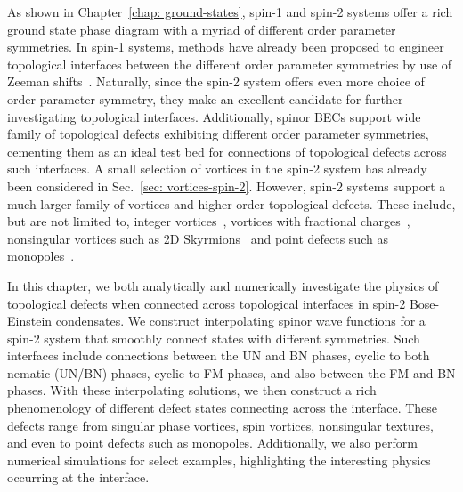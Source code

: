 As shown in Chapter~\ref{chap: ground-states}, spin-1 and spin-2 systems offer a
rich ground state phase diagram with a myriad of different order parameter
symmetries.
In spin-1 systems, methods have already been proposed to engineer topological
interfaces between the different order parameter symmetries by use of Zeeman
shifts~\cite{Borgh2012, Borgh2013, Borgh2014}.
Naturally, since the spin-2 system offers even more choice of order parameter
symmetry, they make an excellent candidate for further investigating topological
interfaces.
Additionally, spinor BECs support wide family of topological defects exhibiting
different order parameter symmetries, cementing them as an ideal test bed
for connections of topological defects across such interfaces.
A small selection of vortices in the spin-2 system has already been considered
in Sec.~\ref{sec: vortices-spin-2}.
However, spin-2 systems support a much larger family of vortices and higher
order topological defects. 
These include, but are not limited to, integer vortices~\cite{Yip1999,
Isoshima2002,Mizushima2002,Sadler2006,Semenoff2007,Lovegrove2012,
Lovegrove2016,Borgh2016,Weiss2019,Xiao2021,Xiao2022}, vortices with fractional
charges~\cite{Leonhardt2000,Zhou2003,Ji2008,Seo2015,Semenoff2007,Kobayashi2009,
Lovegrove2012,Lovegrove2016,Borgh2016,Borgh2017,Xiao2021,Xiao2022}, nonsingular
vortices such as 2D Skyrmions~\cite{Ohmi1998, Ho1998, Mizushima2002a,
Martikainen2002, Leanhardt2003, Mizushima2004, Choi2012, Choi2012a,
Lovegrove2014,Weiss2019} and point defects such as monopoles~\cite{Stoof2001,
Savage2003,Ruostekoski2003,Pietila2009,Ray2014,Ray2015,Ollikainen2017,
Mithun2022,Blinova2023}.

In this chapter, we both analytically and numerically investigate the physics
of topological defects when connected across topological interfaces in spin-2
Bose-Einstein condensates.
We construct interpolating spinor wave functions for a spin-2 system that
smoothly connect states with different symmetries.
Such interfaces include connections between the UN and BN phases, cyclic to both
nematic (UN/BN) phases, cyclic to FM phases, and also between the FM and BN
phases.
With these interpolating solutions, we then construct a rich phenomenology of
different defect states connecting across the interface.
These defects range from singular phase vortices, spin vortices, nonsingular
textures, and even to point defects such as monopoles.
Additionally, we also perform numerical simulations for select examples,
highlighting the interesting physics occurring at the interface.

